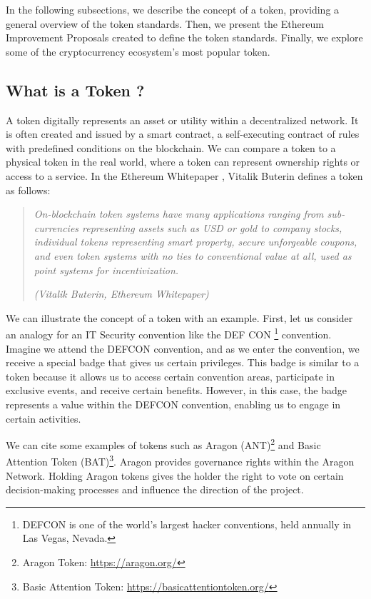 In the following subsections, we describe the concept of a token, providing a general overview of the token standards. Then, we present
the Ethereum Improvement Proposals created to define the token standards. Finally, we explore some of the cryptocurrency ecosystem's most popular
token.



\subsection{What is a Token ?}

A token digitally represents an asset or utility within a decentralized network. It is often created and issued by
a smart contract, a self-executing contract of rules with predefined conditions on the blockchain. We can compare a token
to a physical token in the real world, where a token can represent ownership rights or access to a service. In the Ethereum Whitepaper
\cite{ethereum_white_paper}, Vitalik Buterin defines a token as follows:

\begin{quote}
   \textit{On-blockchain token systems have many applications ranging from sub-currencies representing assets such as USD or gold to
       company stocks, individual tokens representing smart property, secure unforgeable coupons, and even token systems with no ties to
       conventional value at all, used as point systems for incentivization.}


   \textit{(Vitalik Buterin, Ethereum Whitepaper)}
\end{quote}


We can illustrate the concept of a token with an example. First, let us consider an analogy for an IT Security convention like the DEF CON
\footnote{DEFCON is one of the world's largest hacker conventions, held annually in Las Vegas, Nevada.} convention. Imagine we attend
the DEFCON convention, and as we enter the convention, we receive a special badge that gives us certain privileges. This badge
is similar to a token because it allows us to access certain convention areas, participate in exclusive events, and receive certain benefits. However, in this case, the badge represents a value within the DEFCON convention, enabling us to engage
in certain activities.

We can cite some examples of tokens such as Aragon (ANT)\footnote{Aragon Token: \url{https://aragon.org/}} and Basic Attention Token (BAT)\footnote{Basic Attention Token: \url{https://basicattentiontoken.org/}}.
Aragon provides governance rights within the Aragon Network. Holding Aragon tokens gives the holder the right to vote on certain
decision-making processes and influence the direction of the project.

